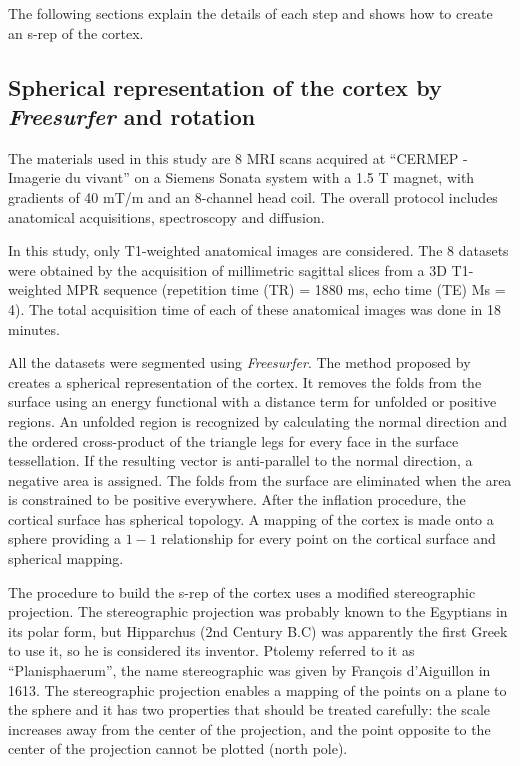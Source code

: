 \documentclass[a4paper,twoside]{article}
\begin{document}
The following sections explain the details of each step and shows how to create an s-rep 
of the cortex.


\subsection{Spherical representation of the cortex by \textit{Freesurfer} and rotation}
\label{sec:Materials}

The materials used in this study are 8 
MRI scans acquired at ``CERMEP - Imagerie du vivant'' 
on a Siemens 
Sonata system with a 1.5 T magnet, with gradients of 40 mT/m and an 8-channel head coil. 
The overall protocol includes anatomical acquisitions, spectroscopy and diffusion.

In this study, only T1-weighted anatomical images are considered. The 8 datasets were obtained by
the acquisition of millimetric sagittal slices from a 3D T1-weighted MPR sequence (repetition time (TR) = 1880 ms, echo time (TE)
Ms = 4).
The total acquisition time of each of these anatomical images was done in 18 minutes.

All the datasets were segmented using \textit{Freesurfer}.
The method proposed by \cite{fischl_cortical_1999} 
creates a spherical representation of the cortex. It removes the folds from the surface using an energy functional 
with a distance term for unfolded or positive regions. 
An unfolded region is recognized by calculating the normal direction and the ordered cross-product
of the triangle legs for every face in the surface tessellation. If the resulting vector 
is anti-parallel to the normal direction, a negative area is assigned. 
The folds from the surface are eliminated when the area is constrained to be
positive everywhere.
After the inflation procedure, the cortical surface has spherical topology. 
A mapping of the cortex is made onto a sphere providing 
a $1-1$ relationship for every point on the cortical surface and spherical mapping.

The procedure to build the s-rep of the cortex uses a modified stereographic projection.
The stereographic projection \cite{snyder_map_1987} was probably known to the Egyptians in its polar form, 
but Hipparchus (2nd Century B.C) was apparently the first Greek to use it, so he is considered its inventor. 
Ptolemy referred to it as ``Planisphaerum'', the name stereographic was given by Fran\c{c}ois d'Aiguillon in 1613.
The stereographic projection enables a mapping of the points on a plane
to the sphere and it has two properties that should be treated carefully:
the scale increases away from the center of the projection,
and the point opposite to the center of the projection cannot be plotted (north pole).
\end{document}
